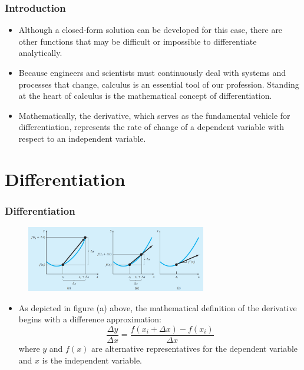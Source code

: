 \documentclass{if-beamer}
\begin{document}
\begin{frame}[t]
	\frametitle{Introduction}
	\begin{itemize}
		\item Although a closed-form solution can be developed for this case, there are other functions that may be difficult or impossible to differentiate analytically. \vspace{1cm}
		\item Because engineers and scientists must continuously deal with systems and processes that change, calculus is an essential tool of our
		profession. Standing at the heart of calculus is the mathematical concept of differentiation. \vspace{1cm}
		\item Mathematically, the derivative, which serves as the fundamental vehicle for differentiation, represents the rate of change
		of a dependent variable with respect to an independent variable. \vspace{1cm}
	\end{itemize}
\end{frame}
\section{Differentiation}
\begin{frame}[t]
	\frametitle{Differentiation}
	\begin{figure}
		\centering
		\includegraphics[width = 0.7\textwidth]{figures/figure1}
	\end{figure}
	\begin{itemize}
		\item As depicted in figure (a) above, the
		mathematical definition of the derivative begins with a difference approximation:
		$$\frac{\Delta y}{\Delta x} = \frac{f(x_i+\Delta x)- f(x_i)}{\Delta x} $$
		where $y$ and $f(x)$ are alternative representatives for the dependent variable and $x$ is the independent variable. 
		\end{itemize}	
\end{frame}
\end{document}
